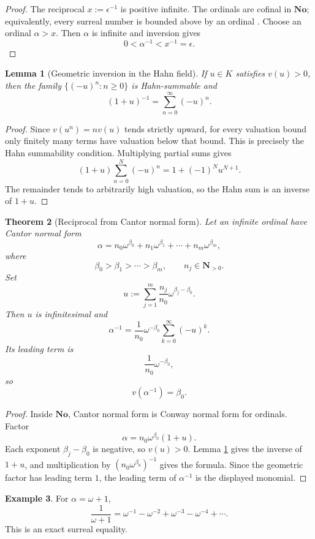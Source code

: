 \documentclass[11pt]{amsart}
\numberwithin{equation}{section}
\newtheorem{theorem}{Theorem}[section]
\newtheorem{lemma}[theorem]{Lemma}
\theoremstyle{definition}
\newtheorem{example}[theorem]{Example}
\newcommand{\N}{\mathbf N}
\newcommand{\No}{\mathbf{No}}
\begin{document}
\begin{proof}
The reciprocal $x:=\epsilon^{-1}$ is positive infinite.  The ordinals are cofinal in $\No$; equivalently, every surreal number is bounded above by an ordinal \cite[Chap.~5]{Conway}.  Choose an ordinal $\alpha>x$.  Then $\alpha$ is infinite and inversion gives
\[
0<\alpha^{-1}<x^{-1}=\epsilon.
\]
\end{proof}

\begin{lemma}[Geometric inversion in the Hahn field]\label{lem:hahn-geometric}
If $u\in K$ satisfies $v(u)>0$, then the family $\{(-u)^n:n\ge0\}$ is Hahn-summable and
\[
(1+u)^{-1}=\sum_{n=0}^{\infty}(-u)^n.
\]
\end{lemma}

\begin{proof}
Since $v(u^n)=nv(u)$ tends strictly upward, for every valuation bound only finitely many terms have valuation below that bound.  This is precisely the Hahn summability condition.  Multiplying partial sums gives
\[
(1+u)\sum_{n=0}^{N}(-u)^n
=1+(-1)^Nu^{N+1}.
\]
The remainder tends to arbitrarily high valuation, so the Hahn sum is an inverse of $1+u$.
\end{proof}

\begin{theorem}[Reciprocal from Cantor normal form]\label{thm:ordinal-inverse-expansion}
Let an infinite ordinal have Cantor normal form
\[
\alpha
=
n_0\omega^{\beta_0}
+n_1\omega^{\beta_1}
+\cdots
+n_m\omega^{\beta_m},
\]
where
\[
\beta_0>\beta_1>\cdots>\beta_m,
\qquad
n_j\in\N_{>0}.
\]
Set
\[
u:=
\sum_{j=1}^{m}
\frac{n_j}{n_0}\omega^{\beta_j-\beta_0}.
\]
Then $u$ is infinitesimal and
\[
\boxed{
\alpha^{-1}
=
\frac1{n_0}\omega^{-\beta_0}
\sum_{k=0}^{\infty}(-u)^k.}
\]
Its leading term is
\[
\frac1{n_0}\omega^{-\beta_0},
\]
so
\[
v(\alpha^{-1})=\beta_0.
\]
\end{theorem}

\begin{proof}
Inside $\No$, Cantor normal form is Conway normal form for ordinals.  Factor
\[
\alpha
=
n_0\omega^{\beta_0}(1+u).
\]
Each exponent $\beta_j-\beta_0$ is negative, so $v(u)>0$.  Lemma \ref{lem:hahn-geometric} gives the inverse of $1+u$, and multiplication by $(n_0\omega^{\beta_0})^{-1}$ gives the formula.  Since the geometric factor has leading term $1$, the leading term of $\alpha^{-1}$ is the displayed monomial.
\end{proof}

\begin{example}
For $\alpha=\omega+1$,
\[
\frac1{\omega+1}
=
\omega^{-1}
-\omega^{-2}
+\omega^{-3}
-\omega^{-4}
+\cdots.
\]
This is an exact surreal equality.
\end{example}
\end{document}

